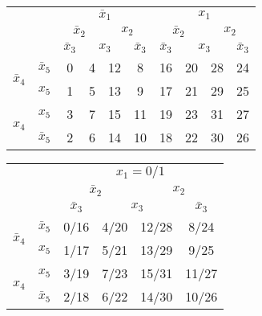 \documentclass[twocolumn]{article}
\newcommand{\bx}{\bar{x}}
\begin{document}
\begin{table*}
  \begin{tabular}{c|c|c|c|c|c|c|c|c|c}
  \toprule
  && \multicolumn{4}{c|}{$\bx_1$} & \multicolumn{4}{c}{$x_1$}
    \\
    && \multicolumn{2}{c|}{$\bx_2$} & \multicolumn{2}{c|}{$x_2$}
               & \multicolumn{2}{c|}{$\bx_2$} & \multicolumn{2}{c}{$x_2$}
  \\
  && $\bx_3$ & \multicolumn{2}{c|}{$x_3$} & $\bx_3$
              & $\bx_3$ & \multicolumn{2}{c|}{$x_3$} & $\bx_3$
  \\ \midrule
  \multirow{2}{*}{$\bx_4$} & $\bx_5$
                                  & 0 & 4 & 12 & 8
                                              & 16 & 20 &  28 & 24
  \\
  & $x_5$
                                  & 1 & 5 & 13 & 9
                                              & 17 & 21 &  29 & 25
  \\
  \multirow{2}{*}{$x_4$}   &  $x_5$
                                  & 3 & 7 & 15 & 11
                                              & 19 & 23 &  31 & 27
  \\
  & $\bx_5$
                                  & 2 & 6 & 14 & 10
                                              & 18 & 22 &  30 & 26
  \\\bottomrule
\end{tabular}
\hfill
\begin{tabular}{c|c|cccc}
  \toprule
  && \multicolumn{4}{c}{$x_1 = 0/1$}
  \\
  && \multicolumn{2}{c|}{$\bx_2$} & \multicolumn{2}{c}{$x_2$}
                                    
  \\
  && $\bx_3$ & \multicolumn{2}{|c|}{$x_3$} & $\bx_3$
  \\ \midrule
  \multirow{2}{*}{$\bx_4$} & $\bx_5$
  &
    0/16 & 4/20 &  12/28 & 8/24
  \\
  & $x_5$
  &
    1/17 & 5/21  & 13/29 & 9/25
  \\
  \multirow{2}{*}{$x_4$}   &  $x_5$
  &
    3/19 & 7/23 &  15/31 & 11/27
  \\
  & $\bx_5$
  &
    2/18 & 6/22 & 14/30 & 10/26
  \\\bottomrule
\end{tabular}
\caption{K-map for 5-variables with numbered minterms}
\end{table*}
\end{document}
